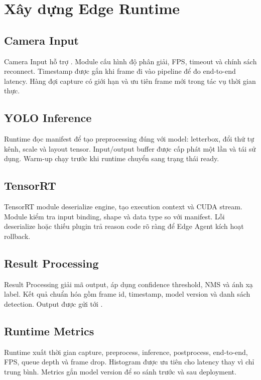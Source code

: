 \section{Xây dựng Edge Runtime}

\subsection{Camera Input}

Camera Input hỗ trợ . Module cấu hình độ
phân giải, FPS, timeout và chính sách reconnect. Timestamp được gắn khi frame đi
vào pipeline để đo end-to-end latency. Hàng đợi capture có giới hạn và ưu tiên
frame mới trong tác vụ thời gian thực.

\subsection{YOLO Inference}

Runtime đọc manifest để tạo preprocessing đúng với model: letterbox, đổi thứ tự
kênh, scale và layout tensor. Input/output buffer được cấp phát một lần và tái sử
dụng. Warm-up chạy trước khi runtime chuyển sang trạng thái ready.

\subsection{TensorRT}

TensorRT module deserialize engine, tạo execution context và CUDA stream. Module
kiểm tra input binding, shape và data type so với manifest. Lỗi deserialize hoặc
thiếu plugin trả reason code rõ ràng để Edge Agent kích hoạt rollback.

\subsection{Result Processing}

Result Processing giải mã output, áp dụng confidence threshold, NMS và ánh xạ
label. Kết quả chuẩn hóa gồm frame id, timestamp, model version và danh sách
detection. Output được gửi tới .

\subsection{Runtime Metrics}

Runtime xuất thời gian capture, preprocess, inference, postprocess, end-to-end,
FPS, queue depth và frame drop. Histogram được ưu tiên cho latency thay vì chỉ
trung bình. Metrics gắn model version để so sánh trước và sau deployment.